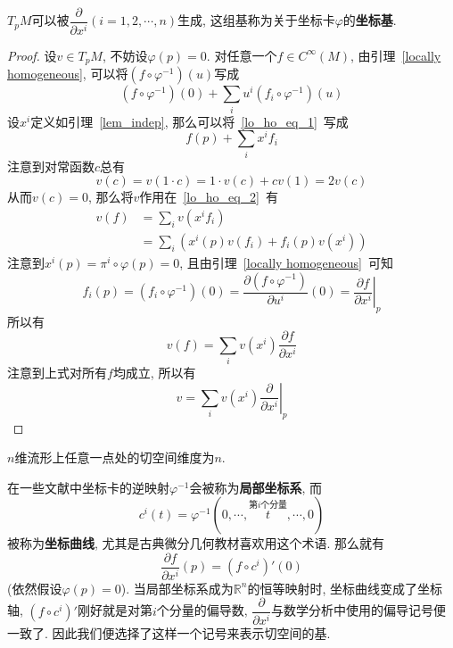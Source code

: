 \begin{prop}
    $T_pM$可以被$\dfrac{\partial}{\partial x^i}(i=1,2,\cdots,n)$生成, 这组基称为关于坐标卡$\varphi$的{\bf 坐标基}.
\end{prop}
\begin{proof}
    设$v\in T_pM$, 不妨设$\varphi(p)=0$.
    对任意一个$f\in C^\infty(M)$, 由引理~\ref{locally homogeneous}, 可以将$(f\circ\varphi^{-1})(u)$写成
    \begin{equation}
        (f\circ\varphi^{-1})(0)+\sum_iu^i(f_i\circ\varphi^{-1})(u)\label{lo_ho_eq_1}
    \end{equation}
    设$x^i$定义如引理~\ref{lem_indep}, 那么可以将~\eqref{lo_ho_eq_1}~写成
    \begin{equation}
        f(p)+\sum_ix^if_i\label{lo_ho_eq_2}
    \end{equation}
    注意到对常函数$c$总有
    \[v(c)=v(1\cdot c)=1\cdot v(c)+cv(1)=2v(c)\]
    从而$v(c)=0$, 那么将$v$作用在~\eqref{lo_ho_eq_2}~有
    \begin{align*}
        v(f)&=\sum_iv\left(x^if_i\right)\\
        &=\sum_i\left(x^i(p)v(f_i)+f_i(p)v(x^i)\right)
    \end{align*}
    注意到$x^i(p)=\pi^i\circ\varphi(p)=0$, 且由引理~\ref{locally homogeneous}~可知
    \[f_i(p)=(f_i\circ\varphi^{-1})(0)=\dfrac{\partial(f\circ\varphi^{-1})}{\partial u^i}(0)=\left.\dfrac{\partial f}{\partial x^i}\right|_p\]
    所以有
    \[v(f)=\sum_iv(x^i)\frac{\partial f}{\partial x^i}\]
    注意到上式对所有$f$均成立, 所以有
    \begin{equation}
        v=\sum_iv(x^i)\left.\frac{\partial}{\partial x^i}\right|_p\label{tangent vector}
    \end{equation}
\end{proof}

\begin{col}
    $n$维流形上任意一点处的切空间维度为$n$.
\end{col}

\begin{rem}
    在一些文献中坐标卡的逆映射$\varphi^{-1}$会被称为\textbf{局部坐标系}, 而
    \[c^i(t)=\varphi^{-1}(0,\cdots,\stackrel{{\text{第}i\text{个分量}}}{t},\cdots,0)\]
    被称为\textbf{坐标曲线}, 尤其是古典微分几何教材喜欢用这个术语.
    那么就有
    \[\dfrac{\partial f}{\partial x^i}(p)=(f\circ c^i)'(0)\]
    (依然假设$\varphi(p)=0$).
    当局部坐标系成为$\mathbb{R}^n$的恒等映射时, 坐标曲线变成了坐标轴, $(f\circ c^i)'$刚好就是对第$i$个分量的偏导数, $\dfrac{\partial}{\partial x^i}$与数学分析中使用的偏导记号便一致了.
    因此我们便选择了这样一个记号来表示切空间的基.
\end{rem}

